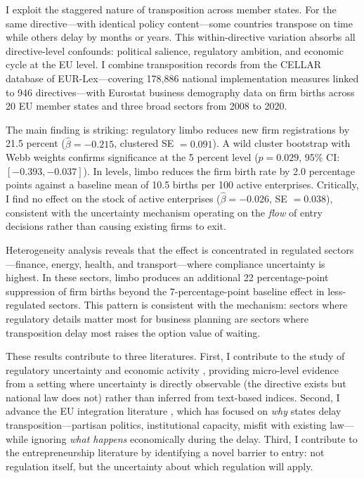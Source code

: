 \documentclass[12pt]{article}
\begin{document}
I exploit the staggered nature of transposition across member states. For the same directive---with identical policy content---some countries transpose on time while others delay by months or years. This within-directive variation absorbs all directive-level confounds: political salience, regulatory ambition, and economic cycle at the EU level. I combine transposition records from the CELLAR database of EUR-Lex---covering 178,886 national implementation measures linked to 946 directives---with Eurostat business demography data on firm births across 20 EU member states and three broad sectors from 2008 to 2020.

The main finding is striking: regulatory limbo reduces new firm registrations by 21.5 percent ($\hat{\beta} = -0.215$, clustered SE $= 0.091$). A wild cluster bootstrap with Webb weights confirms significance at the 5 percent level ($p = 0.029$, 95\% CI: $[-0.393, -0.037]$). In levels, limbo reduces the firm birth rate by 2.0 percentage points against a baseline mean of 10.5 births per 100 active enterprises. Critically, I find no effect on the stock of active enterprises ($\hat{\beta} = -0.026$, SE $= 0.038$), consistent with the uncertainty mechanism operating on the \textit{flow} of entry decisions rather than causing existing firms to exit.

Heterogeneity analysis reveals that the effect is concentrated in regulated sectors---finance, energy, health, and transport---where compliance uncertainty is highest. In these sectors, limbo produces an additional 22 percentage-point suppression of firm births beyond the 7-percentage-point baseline effect in less-regulated sectors. This pattern is consistent with the mechanism: sectors where regulatory details matter most for business planning are sectors where transposition delay most raises the option value of waiting.

These results contribute to three literatures. First, I contribute to the study of regulatory uncertainty and economic activity \citep{baker2016, bloom2007, handley2015}, providing micro-level evidence from a setting where uncertainty is directly observable (the directive exists but national law does not) rather than inferred from text-based indices. Second, I advance the EU integration literature \citep{konig2006, mastenbroek2003, falkner2004}, which has focused on \textit{why} states delay transposition---partisan politics, institutional capacity, misfit with existing law---while ignoring \textit{what happens} economically during the delay. Third, I contribute to the entrepreneurship literature \citep{klapper2006, djankov2002, ciccone2012} by identifying a novel barrier to entry: not regulation itself, but the uncertainty about which regulation will apply.
\end{document}
